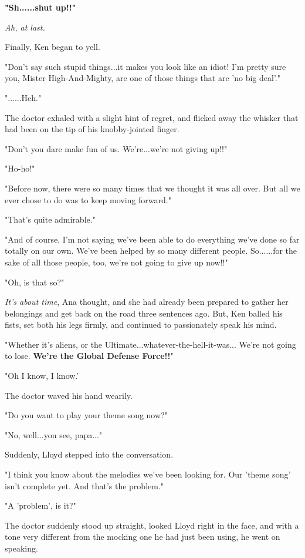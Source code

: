 \documentclass[
]{article}
\begin{document}
\textbf{"Sh......shut up!!"}

\emph{Ah, at last.}

Finally, Ken began to yell.

"Don't say such stupid things...it makes you look like an idiot! I'm
pretty sure you, Mister High-And-Mighty, are one of those things that
are 'no big deal'."

"......Heh."

The doctor exhaled with a slight hint of regret, and flicked away the
whisker that had been on the tip of his knobby-jointed finger.

"Don't you dare make fun of us. We're...we're not giving up!!"

"Ho-ho!"

"Before now, there were so many times that we thought it was all over.
But all we ever chose to do was to keep moving forward."

"That's quite admirable."

"And of course, I'm not saying we've been able to do everything we've
done so far totally on our own. We've been helped by so many different
people. So......for the sake of all those people, too, we're not going
to give up now!!"

"Oh, is that so?"

\emph{It's about time}, Ana thought, and she had already been prepared
to gather her belongings and get back on the road three sentences ago.
But, Ken balled his fists, set both his legs firmly, and continued to
passionately speak his mind.

"Whether it's aliens, or the Ultimate...whatever-the-hell-it-was...
We're not going to lose. \textbf{We're the Global Defense Force!!}"

"Oh I know, I know.'

The doctor waved his hand wearily.

"Do you want to play your theme song now?"

"No, well...you see, papa..."

Suddenly, Lloyd stepped into the conversation.

"I think you know about the melodies we've been looking for. Our 'theme
song' isn't complete yet. And that's the problem."

"A 'problem', is it?"

The doctor suddenly stood up straight, looked Lloyd right in the face,
and with a tone very different from the mocking one he had just been
using, he went on speaking.
\end{document}
